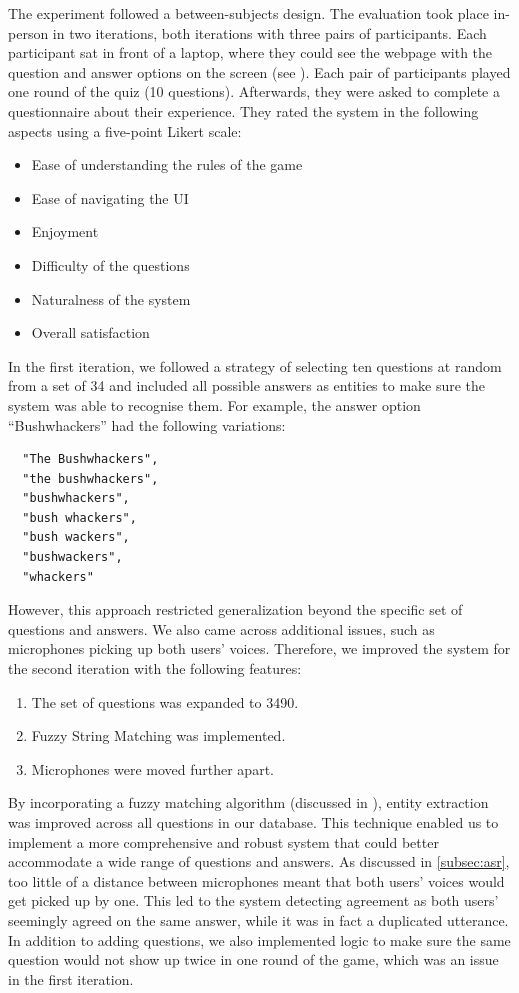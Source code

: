 \documentclass[hidelinks, 11pt]{article}
\begin{document}
The experiment followed a between-subjects design. The evaluation took place in-person in two iterations, both iterations with three pairs of participants. Each participant sat in front of a laptop, where they could see the webpage with the question and answer options on the screen (see ). Each pair of participants played one round of the quiz (10 questions). Afterwards, they were asked to complete a questionnaire about their experience. They rated the system in the following aspects using a five-point Likert scale:

\begin{itemize}
  \item Ease of understanding the rules of the game
  \item Ease of navigating the UI
  \item Enjoyment
  \item Difficulty of the questions
  \item Naturalness of the system
  \item Overall satisfaction
\end{itemize}

In the first iteration, we followed a strategy of selecting ten questions at random from a set of 34 and included all possible answers as entities to make sure the system was able to recognise them. For example, the answer option ``Bushwhackers'' had the following variations:

\begin{verbatim}
  "The Bushwhackers",
  "the bushwhackers",
  "bushwhackers",
  "bush whackers",
  "bush wackers",
  "bushwackers",
  "whackers"
\end{verbatim}

However, this approach restricted generalization beyond the specific set of questions and answers. We also came across additional issues, such as microphones picking up both users' voices. Therefore, we improved the system for the second iteration with the following features:

\begin{enumerate}
  \item The set of questions was expanded to 3490.
  \item Fuzzy String Matching was implemented.
  \item Microphones were moved further apart.
\end{enumerate}

By incorporating a fuzzy matching algorithm (discussed in ), entity extraction was improved across all questions in our database. This technique enabled us to implement a more comprehensive and robust system that could better accommodate a wide range of questions and answers. As discussed in \cref*{subsec:asr}, too little of a distance between microphones meant that both users' voices would get picked up by one. This led to the system detecting agreement as both users' seemingly agreed on the same answer, while it was in fact a duplicated utterance. In addition to adding questions, we also implemented logic to make sure the same question would not show up twice in one round of the game, which was an issue in the first iteration.
\end{document}
